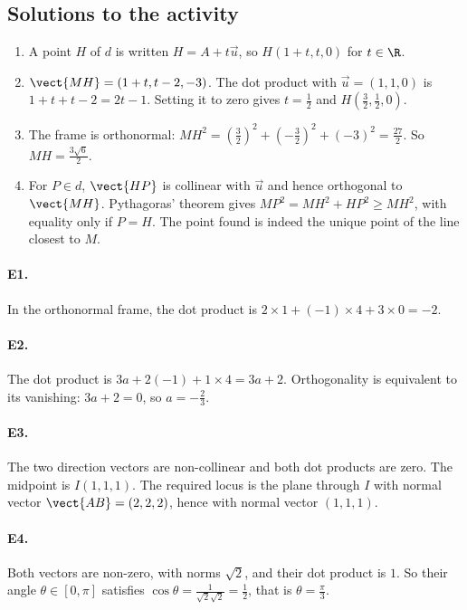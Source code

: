 \subsection{Solutions to the activity}\begin{enumerate}
\item A point $H$ of $d$ is written $H=A+t\vec u$, so $H(1+t,t,0)$ for $t\in\R$.
\item $\vect{MH}=(1+t,t-2,-3)$. The dot product with $\vec u=(1,1,0)$ is $1+t+t-2=2t-1$. Setting it to zero gives $t=\frac{1}{2}$ and $H(\frac{3}{2},\frac{1}{2},0)$.
\item The frame is orthonormal: $MH^2=(\frac{3}{2})^2+(-\frac{3}{2})^2+(-3)^2=\frac{27}{2}$. So $MH=\frac{3\sqrt{6}}{2}$.
\item For $P\in d$, $\vect{HP}$ is collinear with $\vec u$ and hence orthogonal to $\vect{MH}$. Pythagoras' theorem gives $MP^2=MH^2+HP^2\ge MH^2$, with equality only if $P=H$. The point found is indeed the unique point of the line closest to $M$.
\end{enumerate}

\paragraph{E1.}In the orthonormal frame, the dot product is $2\times1+(-1)\times4+3\times0=-2$.

\paragraph{E2.}The dot product is $3a+2(-1)+1\times4=3a+2$. Orthogonality is equivalent to its vanishing: $3a+2=0$, so $a=-\frac{2}{3}$.

\paragraph{E3.}The two direction vectors are non-collinear and both dot products are zero. The midpoint is $I(1,1,1)$. The required locus is the plane through $I$ with normal vector $\vect{AB}=(2,2,2)$, hence with normal vector $(1,1,1)$.

\paragraph{E4.}Both vectors are non-zero, with norms $\sqrt2$, and their dot product is $1$. So their angle $\theta\in[0,\pi]$ satisfies $\cos \theta=\frac{1}{\sqrt2\sqrt2}=\frac{1}{2}$, that is $\theta=\frac{\pi}{3}$.

